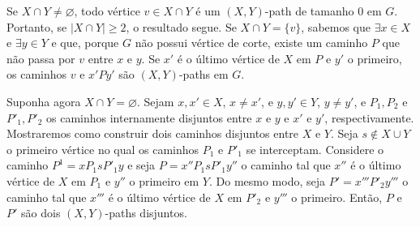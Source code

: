 
Se $X \cap Y \ne \varnothing$, todo vértice $v \in X \cap Y$ é um $(X,Y)$-path
de tamanho $0$ em $G$. Portanto, se $|X \cap Y| \ge 2$, o resultado segue. Se
$X \cap Y = \{v\}$, sabemos que $\exists x \in X$ e $\exists y \in Y$ e que,
porque $G$ não possui vértice de corte, existe um caminho $P$ que não passa por
$v$ entre $x$ e $y$. Se $x'$ é o último vértice de $X$ em $P$ e $y'$ o
primeiro, os caminhos $v$ e $x'Py'$ são $(X,Y)$-paths em $G$.

Suponha agora $X \cap Y = \varnothing$. Sejam $x, x' \in X$, $x \ne x'$, e
$y, y' \in Y$, $y \ne y'$, e $P_1, P_2$ e $P'_1, P'_2$ os caminhos internamente
disjuntos entre $x$ e $y$ e $x'$ e $y'$, respectivamente. Mostraremos como
construir dois caminhos disjuntos entre $X$ e $Y$. Seja $s \not \in X \cup Y$ o
primeiro vértice no qual os caminhos $P_1$ e $P'_1$ se interceptam. Considere o
caminho $P^1 = xP_1sP'_1y$ e seja $P = x''P_1sP'_1y''$ o caminho tal que $x''$
é o último vértice de $X$ em $P_1$ e $y''$ o primeiro em $Y$. Do mesmo modo,
seja $P' = x'''P'_2y'''$ o caminho tal que $x'''$ é o último vértice de $X$ em
$P'_2$ e $y'''$ o primeiro. Então, $P$ e $P'$ são dois $(X,Y)$-paths disjuntos.
\fimprova

